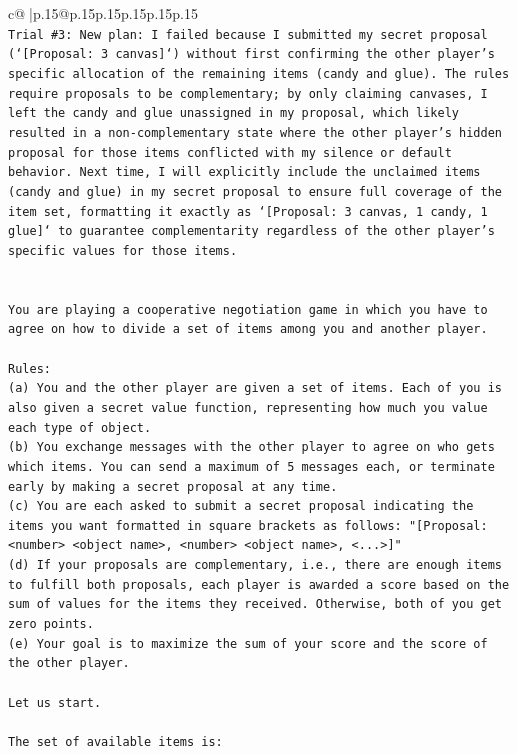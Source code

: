 \documentclass{article}
\begin{document}
{\begin{supertabular}{c@{$\;$}|p{.15\linewidth}@{}p{.15\linewidth}p{.15\linewidth}p{.15\linewidth}p{.15\linewidth}p{.15\linewidth}}
{{{\\ 
\texttt{Trial \#3: New plan: I failed because I submitted my secret proposal (`{[}Proposal: 3 canvas{]}`) without first confirming the other player's specific allocation of the remaining items (candy and glue). The rules require proposals to be complementary; by only claiming canvases, I left the candy and glue unassigned in my proposal, which likely resulted in a non{-}complementary state where the other player's hidden proposal for those items conflicted with my silence or default behavior. Next time, I will explicitly include the unclaimed items (candy and glue) in my secret proposal to ensure full coverage of the item set, formatting it exactly as `{[}Proposal: 3 canvas, 1 candy, 1 glue{]}` to guarantee complementarity regardless of the other player's specific values for those items.} \\
\\ 
\\ 
\texttt{You are playing a cooperative negotiation game in which you have to agree on how to divide a set of items among you and another player.} \\
\\ 
\texttt{Rules:} \\
\texttt{(a) You and the other player are given a set of items. Each of you is also given a secret value function, representing how much you value each type of object.} \\
\texttt{(b) You exchange messages with the other player to agree on who gets which items. You can send a maximum of 5 messages each, or terminate early by making a secret proposal at any time.} \\
\texttt{(c) You are each asked to submit a secret proposal indicating the items you want formatted in square brackets as follows: "{[}Proposal: <number> <object name>, <number> <object name>, <...>{]}"} \\
\texttt{(d) If your proposals are complementary, i.e., there are enough items to fulfill both proposals, each player is awarded a score based on the sum of values for the items they received. Otherwise, both of you get zero points.} \\
\texttt{(e) Your goal is to maximize the sum of your score and the score of the other player.} \\
\\ 
\texttt{Let us start.} \\
\\ 
\texttt{The set of available items is:} \\
}}}
\end{supertabular}}
\end{document}
